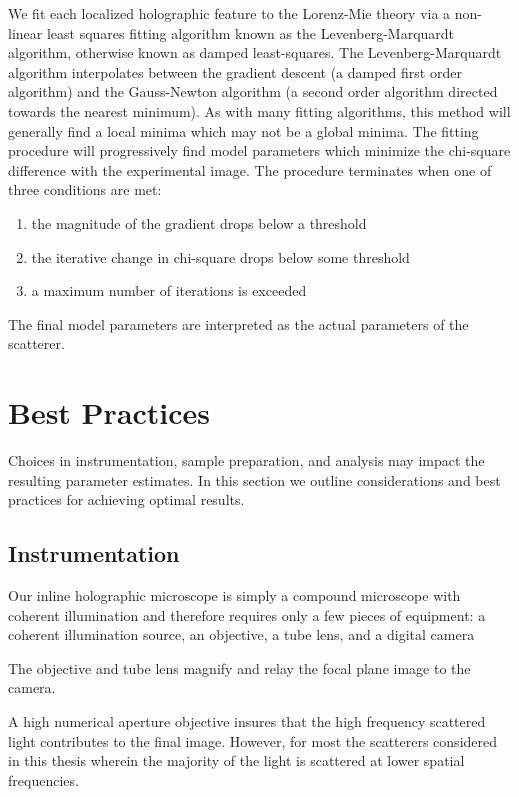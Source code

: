 We fit each localized holographic feature to the Lorenz-Mie theory
via a non-linear least squares fitting algorithm known as the Levenberg-Marquardt
algorithm, otherwise known as damped least-squares. The Levenberg-Marquardt
algorithm interpolates between the gradient descent (a damped first order algorithm)
and the Gauss-Newton algorithm (a second order algorithm directed towards the nearest
minimum). As with many fitting algorithms, this method will generally find a local
minima which may not be a global minima. The fitting procedure will
progressively find model parameters which minimize the chi-square difference
with the experimental image. The procedure terminates when one of three
conditions are met:
\begin{enumerate}
\item the magnitude of the gradient drops below a threshold
\item the iterative change in chi-square drops below some threshold
\item a maximum number of iterations is exceeded
\end{enumerate}
The final model parameters are interpreted as the actual parameters of the
scatterer.


\section{Best Practices}

Choices in instrumentation, sample preparation, and analysis may impact
the resulting parameter estimates. In this section we outline considerations
and best practices for achieving optimal results.

\subsection{Instrumentation}

Our inline holographic microscope is simply a compound microscope with
coherent illumination and therefore requires only a few pieces of equipment:
a coherent illumination source, an objective, a tube lens, and a digital
camera

The objective and tube lens magnify and relay the focal plane image to the
camera. 

A high numerical aperture objective insures that the high frequency scattered
light contributes to the final image. However, for most the scatterers considered
in this thesis wherein the majority of the light is scattered at lower spatial
frequencies. %



